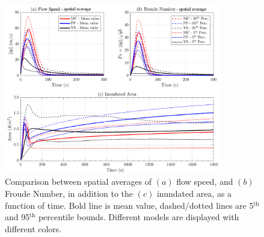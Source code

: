 \documentclass{article}
\begin{document}
\begin{figure}[H]
        \centering
        \includegraphics[width=0.85\textwidth]{figures/Colima/AveragedColima.png}
        \caption{Comparison between spatial averages of $(a)$ flow speed, and $(b)$ Froude Number, in addition to the $(c)$ inundated area, as a function of time. Bold line is mean value, dashed/dotted lines are 5$^{\mathrm{th}}$ and 95$^{\mathrm{th}}$ percentile bounds. Different models are displayed with different colors.}
        \label{fig:Colima-spatial}
\end{figure}
\end{document}
